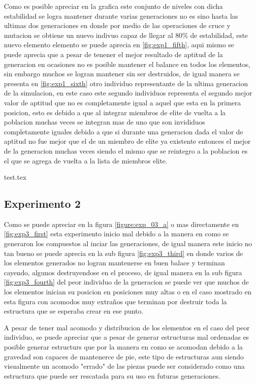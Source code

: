 Como es posible apreciar en la grafica este conjunto de niveles con dicha
estabilidad se logra mantener durante varias generaciones no es sino hasta las
ultimas dos generaciones en donde por medio de las operaciones de cruce y
mutacion se obtiene un nuevo indivuo capaz de llegar al 80\% de estabilidad,
este nuevo elemento elemento se puede aprecia en \ref{fig:exp1_fifth}, aqui
mismo se puede aprecia que a pesar de tenener el mejor resultado de aptitud de
la generacion en ocasiones no es posible mantener el balance en todos los
elementos, sin embargo muchos se logran mantener sin ser destruidos, de igual
manera se presenta en \ref{fig:exp1_sixth} otro individuo representante de la
ultima generacion de la simulacion, en este caso este segundo individuos
representa el segundo mejor valor de aptitud que no es completamente igual a
aquel que esta en la primera posicion, esto es debido a que al integrar miembros
de elite de vuelta a la poblacion muchas veces se integran mas de uno que son
invididuos completamente iguales debido a que si durante una generacion dada el
valor de aptitud no fue mejor que el de un miembro de elite ya existente
entonces el mejor de la generacion muchas veces siendo el mismo que se reintegro
a la poblacion es el que se agrega de vuelta a la lista de miembros elite.

{test.tex} 

\newpage

\subsection{Experimento 2}
\label{chap6:exp_2}

Como se puede apreciar en la figura \ref{figure:exp_03_a} o mas directamente en
\ref{fig:exp3_first} esta experimento inicio mal debido a la manera en como se
generaron los compuestos al inciar las generaciones, de igual manera este inicio
no tan bueno se puede aprecia en la sub figura \ref{fig:exp3_third} en donde
varios de los elementos generados no logran mantenerse en buen balace y terminan
cayendo, algunos destruyendose en el proceso, de igual manera en la sub figura
\ref{fig:exp3_fourth} del peor individuo de la generacion se puede ver que
muchos de los elementos inician su posicion en posiciones muy altas o en el caso
mostrado en esta figura con acomodos muy extraños que terminan por destruir toda
la estructura que se esperaba crear en ese punto.

A pesar de tener mal acomodo y distribucion de los elementos en el caso del peor
individuo, se puede apreciar que a pesar de generar estructuras mal ordenadas es
posible generar estructurs que por la manera en como se acomodan debido a la
gravedad son capaces de mantenerce de pie, este tipo de estructuras aun siendo
visualmente un acomodo "errado" de las piezas puede ser considerado como una
estructura que puede ser rescatada para su uso en futuras generaciones.

